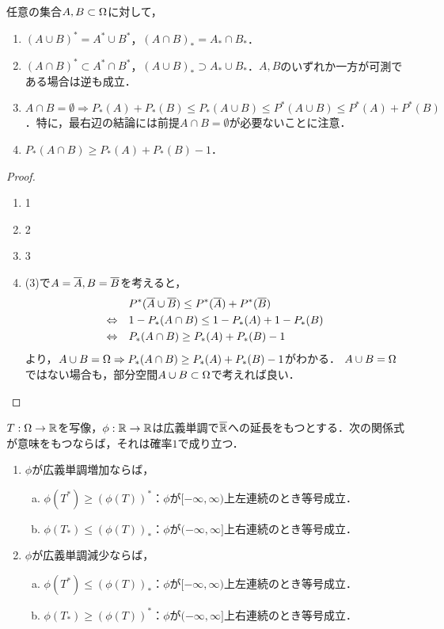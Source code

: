 \documentclass[uplatex,dvipdfmx]{jsreport}
\begin{document}
\begin{lemma}\label{lemma-character-of-minimal-measurable-set}
    任意の集合$A,B\subset\Omega$に対して，
    \begin{enumerate}
        \item $(A\cup B)^*=A^*\cup B^*$，$(A\cap B)_*=A_*\cap B_*$．
        \item $(A\cap B)^*\subset A^*\cap B^*$，$(A\cup B)_*\supset A_*\cup B_*$．$A,B$のいずれか一方が可測である場合は逆も成立．
        \item $A\cap B=\emptyset\Rightarrow P_*(A)+P_*(B)\le P_*(A\cup B)\le P^*(A\cup B)\le P^*(A)+P^*(B)$．特に，最右辺の結論には前提$A\cap B=\emptyset$が必要ないことに注意．
        \item $P_*(A\cap B)\ge P_*(A)+P_*(B)-1$．
    \end{enumerate}
\end{lemma}
\begin{proof}\mbox{}
    \begin{enumerate}
        \item 1
        \item 2
        \item 3
        \item (3)で$A=\overline{A},B=\overline{B}$を考えると，
        \begin{align*}
            &P^*(\overline{A}\cup\overline{B})\le P^*(\overline{A})+P^*(\overline{B})\\
            \Leftrightarrow\quad&1-P_*(A\cap B)\le 1-P_*(A)+1-P_*(B)\\
            \Leftrightarrow\quad&P_*(A\cap B)\ge P_*(A)+P_*(B)-1
        \end{align*}
        より，$A\cup B=\Omega\Rightarrow P_*(A\cap B)\ge P_*(A)+P_*(B)-1$がわかる．
        $A\cup B=\Omega$ではない場合も，部分空間$A\cup B\subset\Omega$で考えれば良い．
    \end{enumerate}
\end{proof}

\begin{lemma}
    $T:\Omega\to\mathbb{R}$を写像，$\phi:\mathbb{R}\to\mathbb{R}$は広義単調で$\overline{\mathbb{R}}$への延長をもつとする．次の関係式が意味をもつならば，それは確率$1$で成り立つ．
    \begin{enumerate}
        \item $\phi$が広義単調増加ならば，
        \begin{enumerate}[(a)]
            \item $\phi(T^*)\ge(\phi(T))^*$：$\phi$が$[-\infty,\infty)$上左連続のとき等号成立．
            \item $\phi(T_*)\le(\phi(T))_*$：$\phi$が$(-\infty,\infty]$上右連続のとき等号成立．
        \end{enumerate}
        \item $\phi$が広義単調減少ならば，
        \begin{enumerate}[(a)]
            \item $\phi(T^*)\le(\phi(T))_*$：$\phi$が$[-\infty,\infty)$上左連続のとき等号成立．
            \item $\phi(T_*)\ge(\phi(T))^*$：$\phi$が$(-\infty,\infty]$上右連続のとき等号成立．
        \end{enumerate}
    \end{enumerate}
\end{lemma}
\end{document}
